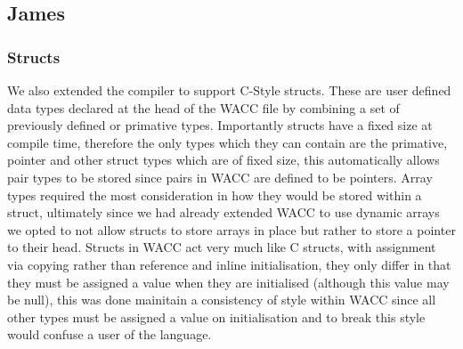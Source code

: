 \documentclass[]{article}
\begin{document}
\subsection{James}
\subsubsection{Structs} { We also extended the compiler to support C-Style structs. These are user defined data types declared at the head of the WACC file by combining a set of previously defined or primative types. Importantly structs have a fixed size at compile time, therefore the only types which they can contain are the primative, pointer and other struct types which are of fixed size, this automatically allows pair types to be stored since pairs in WACC are defined to be pointers. Array types required the most consideration in how they would be stored within a struct, ultimately since we had already extended WACC to use dynamic arrays we opted to not allow structs to store arrays in place but rather to store a pointer to their head. Structs in WACC act very much like C structs, with assignment via copying rather than reference and inline initialisation, they only differ in that they must be assigned a value when they are initialised (although this value may be null), this was done mainitain a consistency of style within WACC since all other types must be assigned a value on initialisation and to break this style would confuse a user of the language.       

}
\subsubsection{}
\end{document}

